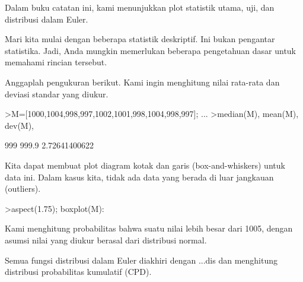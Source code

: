 \documentclass[a4paper,10pt]{article}
\begin{document}
\begin{eulernotebook}
\begin{eulercomment}
Dalam buku catatan ini, kami menunjukkan plot statistik utama, uji,
dan distribusi dalam Euler.

Mari kita mulai dengan beberapa statistik deskriptif. Ini bukan
pengantar statistika. Jadi, Anda mungkin memerlukan beberapa
pengetahuan dasar untuk memahami rincian tersebut.

Anggaplah pengukuran berikut. Kami ingin menghitung nilai rata-rata
dan deviasi standar yang diukur.
\end{eulercomment}
\begin{eulerprompt}
>M=[1000,1004,998,997,1002,1001,998,1004,998,997]; ...
>median(M), mean(M), dev(M),
\end{eulerprompt}
\begin{euleroutput}
  999
  999.9
  2.72641400622
\end{euleroutput}
\begin{eulercomment}
Kita dapat membuat plot diagram kotak dan garis (box-and-whiskers)
untuk data ini. Dalam kasus kita, tidak ada data yang berada di luar
jangkauan (outliers).
\end{eulercomment}
\begin{eulerprompt}
>aspect(1.75); boxplot(M):
\end{eulerprompt}
\begin{eulercomment}
Kami menghitung probabilitas bahwa suatu nilai lebih besar dari 1005,
dengan asumsi nilai yang diukur berasal dari distribusi normal.

Semua fungsi distribusi dalam Euler diakhiri dengan ...dis dan
menghitung distribusi probabilitas kumulatif (CPD).


\end{eulercomment}
\end{eulernotebook}
\end{document}
